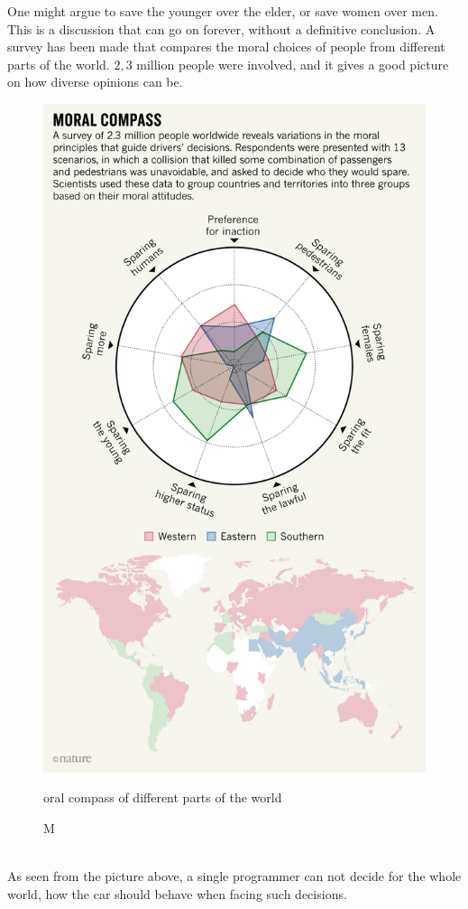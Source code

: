 \noindent One might argue to save the younger over the elder, or save women over men. This is a discussion that can go on forever, without a definitive conclusion. A survey has been made that compares the moral choices of people from different parts of the world. $2,3$ million people were involved, and it gives a good picture on how diverse opinions can be.\\
\begin{figure}[H]
\centering
\includegraphics[width=\textwidth]{Figures/ConAnalysis/General/MoralCompass.png}
\caption Moral compass of different parts of the world{\cite{Ethics}}
\end{figure}

\\
\noindent As seen from the picture above, a single programmer can not decide for the whole world, how the car should behave when facing such decisions.
